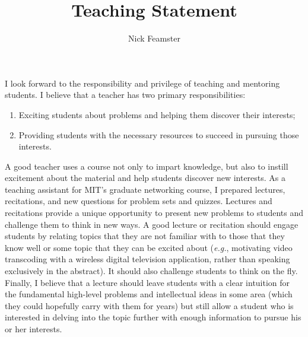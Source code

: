 \documentclass[11pt]{article}
\newcommand{\eg}{{\em e.g.}}
\begin{document}
\title{Teaching Statement}
\author{\Large Nick Feamster}
\date{}
\maketitle


I look forward to the responsibility
and privilege of teaching and mentoring students.
I believe that a teacher has two primary responsibilities: 

\begin{enumerate}
\itemsep=-4pt
\topsep=-5pt
\item Exciting students about problems and helping them discover their interests;
\item Providing students with the necessary resources to succeed in
  pursuing those interests.
\end{enumerate}

A good teacher uses a course not only to impart knowledge, but also to
instill excitement about the material and help students discover new
interests.  As a teaching assistant for MIT's graduate networking
course, I prepared lectures, recitations, and new questions for problem
sets and quizzes.  Lectures and recitations provide a unique opportunity
to present new problems to students and challenge them to think in new
ways.  A good lecture or recitation should engage students by relating
topics that they are not familiar with to those that they know well or
some topic that they can be excited about (\eg, motivating video
transcoding with a wireless digital television application, rather than
speaking exclusively in the abstract).  It should also
challenge students to think on the fly.  Finally, I believe that a
lecture should leave students with a clear intuition for the fundamental
high-level problems and intellectual ideas in some area (which they
could hopefully carry with 
them for years) but still allow a student who is interested
in delving into the topic further with enough information to pursue his
or her interests.
\end{document}
